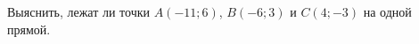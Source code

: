 \begin{ex}
	\begin{condition}
		Выяснить, лежат ли точки \( A(-11;6) \), \( B(-6;3) \) и \( C(4;-3) \) на одной прямой.
	\end{condition}
\end{ex}